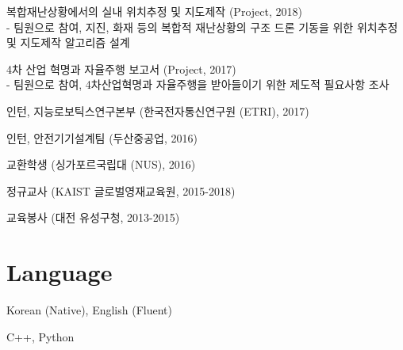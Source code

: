 \documentclass[margin]{res}
\begin{document}
\begin{resume}
		\par	복합재난상황에서의 실내 위치추정 및 지도제작 (Project, 2018)
		\\-	팀원으로 참여, 지진, 화재 등의 복합적 재난상황의 구조 드론 기동을 위한 위치추정 및 지도제작 알고리즘 설계
		\par	4차 산업 혁명과 자율주행 보고서 (Project, 2017)
		\\-	팀원으로 참여, 4차산업혁명과 자율주행을 받아들이기 위한 제도적 필요사항 조사
		\par	인턴, 지능로보틱스연구본부 (한국전자통신연구원 (ETRI), 2017)
		\par	인턴, 안전기기설계팀 (두산중공업, 2016)
		\par	교환학생 (싱가포르국립대 (NUS), 2016)
		\par	정규교사 (KAIST 글로벌영재교육원, 2015-2018)
		\par	교육봉사 (대전 유성구청, 2013-2015)
		
		
		\section{Language}
		\par Korean (Native), English (Fluent)
		\par C++, Python
				
	\end{resume}
\end{document}
